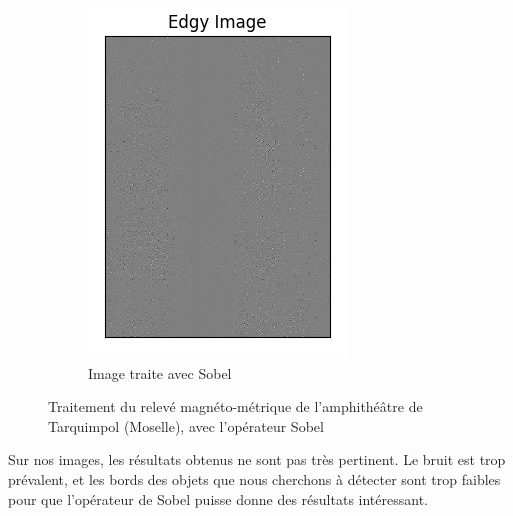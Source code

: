\documentclass[a4paper, 12pt, titlepage, oneside, french]{article}
\begin{document}
\begin{figure}[H]
\begin{subfigure}[]{0.4\linewidth}
			\includegraphics[width=\linewidth]{Sobel1a.png}
			\caption{Image traite avec Sobel}
			
		\end{subfigure}
		\caption{Traitement du relevé magnéto-métrique de l'amphithéâtre de Tarquimpol (Moselle), avec l'opérateur Sobel}
		\label{fig:OurSobel}
	\end{figure}

	Sur nos images, les résultats obtenus ne sont pas très pertinent. Le bruit est trop prévalent, et les bords des objets que nous cherchons à détecter sont trop faibles pour que l'opérateur de Sobel puisse donne des résultats intéressant.
\end{document}
